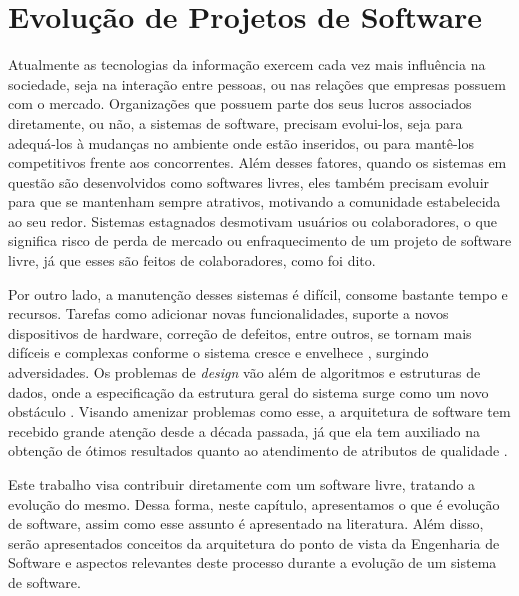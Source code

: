 \chapter{Evolução de Projetos de Software}
\label{chapter-3}

Atualmente as tecnologias da informação exercem cada vez mais influência na sociedade, seja na interação entre pessoas, ou nas relações que empresas possuem com o mercado. Organizações que possuem parte dos seus lucros associados diretamente, ou não, a sistemas de software, precisam evolui-los, seja para adequá-los à mudanças no ambiente onde estão inseridos, ou para mantê-los competitivos frente aos concorrentes. Além desses fatores, quando os sistemas em questão são desenvolvidos como softwares livres, eles também precisam evoluir para que se mantenham sempre atrativos, motivando a comunidade estabelecida ao seu redor. Sistemas estagnados desmotivam usuários ou colaboradores, o que significa risco de perda de mercado ou enfraquecimento de um projeto de software livre, já que esses são feitos de colaboradores, como foi dito.

Por outro lado, a manutenção desses sistemas é difícil, consome bastante tempo e recursos. Tarefas como adicionar novas funcionalidades, suporte a novos dispositivos de hardware, correção de defeitos, entre outros, se tornam mais difíceis e complexas conforme o sistema cresce e envelhece \cite{godfrey2000evolution}, surgindo adversidades. Os problemas de \textit{design} vão além de algoritmos e estruturas de dados, onde a especificação da estrutura geral do sistema surge como um novo obstáculo \cite{garlan1993introduction}. Visando amenizar problemas como esse, a arquitetura de software tem recebido grande atenção  desde a década passada, já que ela tem auxiliado na obtenção de ótimos resultados quanto ao atendimento de atributos de qualidade \cite{fabricio2009instrumentation}.

Este trabalho visa contribuir diretamente com um software livre, tratando a evolução do mesmo. Dessa forma, neste capítulo, apresentamos o que é evolução de software, assim como esse assunto é apresentado na literatura. Além disso, serão apresentados conceitos da arquitetura do ponto de vista da Engenharia de Software e aspectos relevantes deste processo durante a evolução de um sistema de software. %

